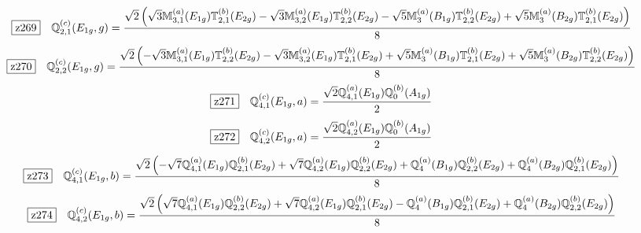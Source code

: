 \documentclass[fleqn,10pt,landscape]{jsarticle}
\begin{document}
\begin{dmath*}
\hspace*{3mm}\fbox{z269}\quad \mathbb{Q}_{2,1}^{(c)}(E_{1g},g)=\frac{\sqrt{2} \left(\sqrt{3} \mathbb{M}_{3,1}^{(a)}(E_{1g}) \mathbb{T}_{2,1}^{(b)}(E_{2g}) - \sqrt{3} \mathbb{M}_{3,2}^{(a)}(E_{1g}) \mathbb{T}_{2,2}^{(b)}(E_{2g}) - \sqrt{5} \mathbb{M}_{3}^{(a)}(B_{1g}) \mathbb{T}_{2,2}^{(b)}(E_{2g}) + \sqrt{5} \mathbb{M}_{3}^{(a)}(B_{2g}) \mathbb{T}_{2,1}^{(b)}(E_{2g})\right)}{8}
\end{dmath*}
\begin{dmath*}
\hspace*{3mm}\fbox{z270}\quad \mathbb{Q}_{2,2}^{(c)}(E_{1g},g)=\frac{\sqrt{2} \left(- \sqrt{3} \mathbb{M}_{3,1}^{(a)}(E_{1g}) \mathbb{T}_{2,2}^{(b)}(E_{2g}) - \sqrt{3} \mathbb{M}_{3,2}^{(a)}(E_{1g}) \mathbb{T}_{2,1}^{(b)}(E_{2g}) + \sqrt{5} \mathbb{M}_{3}^{(a)}(B_{1g}) \mathbb{T}_{2,1}^{(b)}(E_{2g}) + \sqrt{5} \mathbb{M}_{3}^{(a)}(B_{2g}) \mathbb{T}_{2,2}^{(b)}(E_{2g})\right)}{8}
\end{dmath*}
\begin{dmath*}
\hspace*{3mm}\fbox{z271}\quad \mathbb{Q}_{4,1}^{(c)}(E_{1g},a)=\frac{\sqrt{2} \mathbb{Q}_{4,1}^{(a)}(E_{1g}) \mathbb{Q}_{0}^{(b)}(A_{1g})}{2}
\end{dmath*}
\begin{dmath*}
\hspace*{3mm}\fbox{z272}\quad \mathbb{Q}_{4,2}^{(c)}(E_{1g},a)=\frac{\sqrt{2} \mathbb{Q}_{4,2}^{(a)}(E_{1g}) \mathbb{Q}_{0}^{(b)}(A_{1g})}{2}
\end{dmath*}
\begin{dmath*}
\hspace*{3mm}\fbox{z273}\quad \mathbb{Q}_{4,1}^{(c)}(E_{1g},b)=\frac{\sqrt{2} \left(- \sqrt{7} \mathbb{Q}_{4,1}^{(a)}(E_{1g}) \mathbb{Q}_{2,1}^{(b)}(E_{2g}) + \sqrt{7} \mathbb{Q}_{4,2}^{(a)}(E_{1g}) \mathbb{Q}_{2,2}^{(b)}(E_{2g}) + \mathbb{Q}_{4}^{(a)}(B_{1g}) \mathbb{Q}_{2,2}^{(b)}(E_{2g}) + \mathbb{Q}_{4}^{(a)}(B_{2g}) \mathbb{Q}_{2,1}^{(b)}(E_{2g})\right)}{8}
\end{dmath*}
\begin{dmath*}
\hspace*{3mm}\fbox{z274}\quad \mathbb{Q}_{4,2}^{(c)}(E_{1g},b)=\frac{\sqrt{2} \left(\sqrt{7} \mathbb{Q}_{4,1}^{(a)}(E_{1g}) \mathbb{Q}_{2,2}^{(b)}(E_{2g}) + \sqrt{7} \mathbb{Q}_{4,2}^{(a)}(E_{1g}) \mathbb{Q}_{2,1}^{(b)}(E_{2g}) - \mathbb{Q}_{4}^{(a)}(B_{1g}) \mathbb{Q}_{2,1}^{(b)}(E_{2g}) + \mathbb{Q}_{4}^{(a)}(B_{2g}) \mathbb{Q}_{2,2}^{(b)}(E_{2g})\right)}{8}
\end{dmath*}
\end{document}
